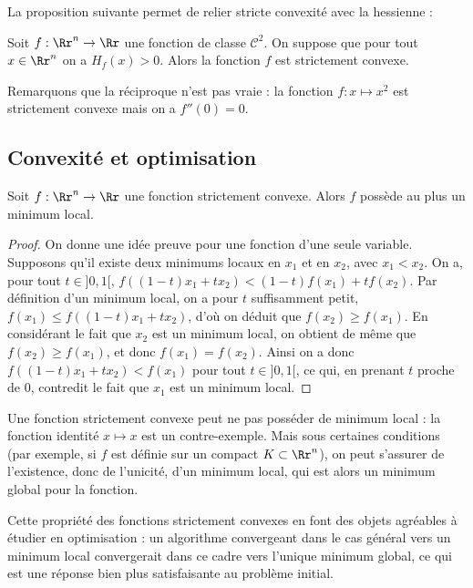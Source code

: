 La proposition suivante permet de relier stricte convexité avec la hessienne : 
\begin{proposition}{}{}
	Soit $f : \Rr^n \to \Rr$ une fonction de classe $\mathcal{C}^2$. On suppose que pour tout $x \in \Rr^n$ on a $H_f(x) > 0$. Alors la fonction $f$ est strictement convexe.
\end{proposition}

Remarquons que la réciproque n'est pas vraie : la fonction $f : x \mapsto x^2$ est strictement convexe mais on a $f''(0)=0$.

\subsection{Convexité et optimisation}

\begin{proposition}{}{}
	Soit $f : \Rr^n \to \Rr$ une fonction strictement convexe. Alors $f$ possède au plus un minimum local.
\end{proposition}

\begin{proof}
	On donne une idée preuve pour une fonction d'une seule variable. Supposons qu'il existe deux minimums locaux en $x_1$ et en $x_2$, avec $x_1<x_2$. On a, pour tout $t \in ]0,1[$, $f((1-t)x_1+tx_2) < (1-t) f(x_1) + t f(x_2)$. Par définition d'un minimum local, on a pour $t$ suffisamment petit, $f(x_1) \le f((1-t)x_1+tx_2)$, d'où on déduit que $f(x_2) \ge f(x_1)$. En considérant le fait que $x_2$ est un minimum local, on obtient de même que $f(x_2) \ge f(x_1)$, et donc $f(x_1)=f(x_2)$. Ainsi on a donc $f((1-t)x_1+tx_2) < f(x_1)$ pour tout $t \in ]0,1[$, ce qui, en prenant $t$ proche de $0$, contredit le fait que $x_1$ est un minimum local.
\end{proof}

Une fonction strictement convexe peut ne pas posséder de minimum local : la fonction identité $x \mapsto x$ est un contre-exemple. Mais sous certaines conditions (par exemple, si $f$ est définie sur un compact $K \subset \Rr^n$), on peut s'assurer de l'existence, donc de l'unicité, d'un minimum local, qui est alors un minimum global pour la fonction.

\bigskip

Cette propriété des fonctions strictement convexes en font des objets agréables à étudier en optimisation : un algorithme convergeant dans le cas général vers un minimum local convergerait dans ce cadre vers l'unique minimum global, ce qui est une réponse bien plus satisfaisante au problème initial.


